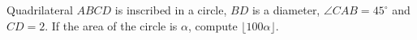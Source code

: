 Quadrilateral $ABCD$ is inscribed in a circle, $BD$ is a diameter, $\angle CAB=45^\circ$ and $CD=2$. If the area of the circle is $\alpha$, compute $\lfloor100\alpha\rfloor$.
